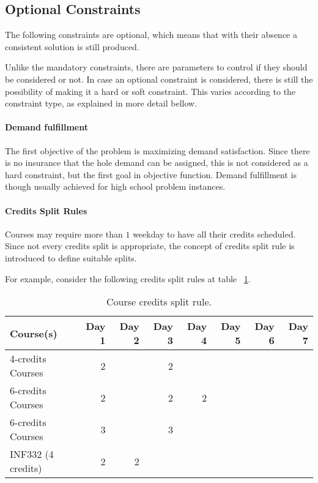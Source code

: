 \subsection{Optional Constraints}
\label{subsec:optional}

The following constraints are optional, which means that with their absence a consistent solution is still produced.

Unlike the mandatory constraints, there are parameters to control if they should be considered or not. In case an optional constraint is considered, there is still the possibility of making it a hard or soft constraint. This varies according to the constraint type, as explained in more detail bellow.


\paragraph{Demand fulfillment}
\label{constrdemandfulfillm}

The first objective of the problem is maximizing demand satisfaction. Since there is no insurance that the hole demand can be assigned, this is not considered as a hard constraint, but the first goal in objective function. Demand fulfillment is though usually achieved for high school problem instances.



\paragraph{Credits Split Rules}
\label{constrsplit}

Courses may require more than $1$ weekday to have all their credits scheduled. Since not every credits split is appropriate, the concept of credits split rule is introduced to define suitable splits.

For example, consider the following credits split rules at table ~\ref{tab:split}.

\begin{table}[H]
\centering
\begin{tabular}{l|r|r|r|r|r|r|r}
Course(s) & Day 1 & Day 2 & Day 3 & Day 4 & Day 5 & Day 6 & Day 7 \\\hline
4-credits Courses & 2 & & 2 & & & & \\
6-credits Courses & 2 & & 2 & 2 & & & \\
6-credits Courses & 3 & & 3 & & & & \\
INF332 (4 credits) & 2 & 2 & & & & & \\
\end{tabular}
\caption{\label{tab:split}Course credits split rule.}
\end{table}

